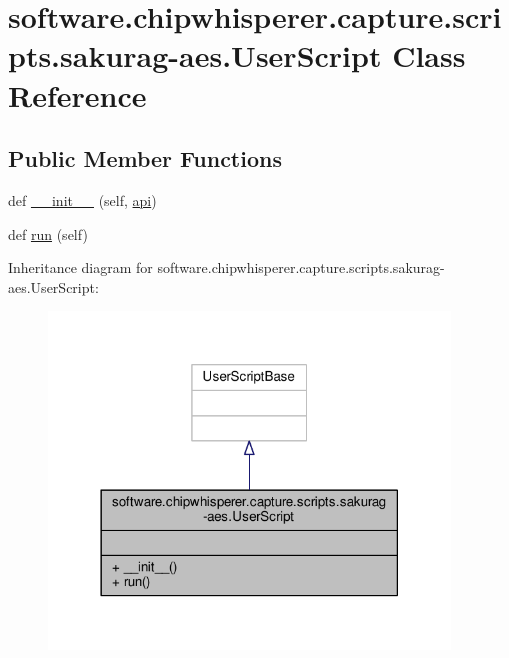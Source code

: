 \hypertarget{classsoftware_1_1chipwhisperer_1_1capture_1_1scripts_1_1sakurag-aes_1_1UserScript}{}\section{software.\+chipwhisperer.\+capture.\+scripts.\+sakurag-\/aes.User\+Script Class Reference}
\label{classsoftware_1_1chipwhisperer_1_1capture_1_1scripts_1_1sakurag-aes_1_1UserScript}
\subsection*{Public Member Functions}
\begin{DoxyCompactItemize}
\item 
def \hyperlink{classsoftware_1_1chipwhisperer_1_1capture_1_1scripts_1_1sakurag-aes_1_1UserScript_a4e15a0f275e79b6865bb603758fc6e84}{\+\_\+\+\_\+init\+\_\+\+\_\+} (self, \hyperlink{namespacesoftware_1_1chipwhisperer_1_1capture_1_1scripts_1_1sakurag-aes_a0a6143af4cb02c4fc4effc737f95578b}{api})
\item 
def \hyperlink{classsoftware_1_1chipwhisperer_1_1capture_1_1scripts_1_1sakurag-aes_1_1UserScript_a4f9d3ac9280c0e6980ceb80aba9e8699}{run} (self)
\end{DoxyCompactItemize}


Inheritance diagram for software.\+chipwhisperer.\+capture.\+scripts.\+sakurag-\/aes.User\+Script\+:\nopagebreak
\begin{figure}[H]
\begin{center}
\leavevmode
\includegraphics[width=302pt]{dd/d67/classsoftware_1_1chipwhisperer_1_1capture_1_1scripts_1_1sakurag-aes_1_1UserScript__inherit__graph}
\end{center}
\end{figure}


